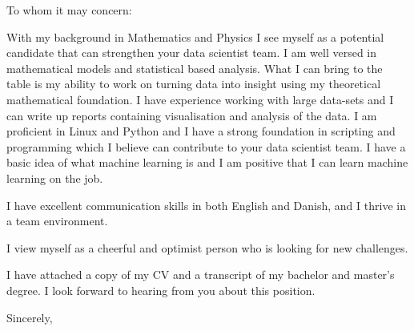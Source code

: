 \documentclass[10pt,a4paper]{letter}
\begin{document}
\begin{letter}{}
\opening{To whom it may concern:}

With my background in Mathematics and Physics I see myself as a potential candidate that can strengthen your data scientist team. I am well versed in mathematical models and statistical based analysis. What I can bring to the table is my ability to work on turning data into insight using my theoretical mathematical foundation. I have experience working with large data-sets and I can write up reports containing visualisation and analysis of the data. I am proficient in Linux and Python and I have a strong foundation in scripting and programming which I believe can contribute to your data scientist team. I have a basic idea of what machine learning is and I am positive that I can learn machine learning on the job.
 
I have excellent communication skills in both English and Danish, and I thrive in a team environment. 

I view myself as a cheerful and optimist person who is looking for new challenges.

I have attached a copy of my CV and a transcript of my bachelor and master's degree. I look forward to hearing from you about this position.   

\closing{Sincerely,}

\end{letter}

\end{document}
